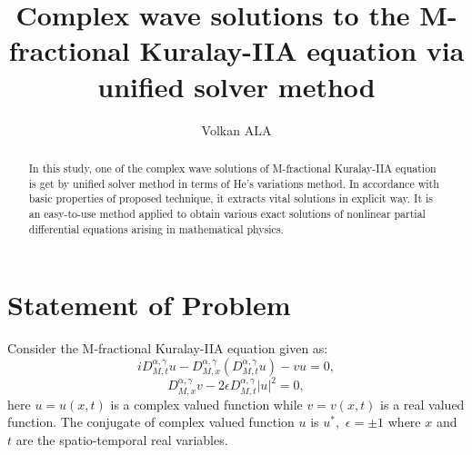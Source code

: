 \documentclass[12pt]{llncs}
\begin{document}
\fi

\title{Complex wave solutions to the M-fractional Kuralay-IIA equation via unified solver method}

\author{Volkan ALA 
  }

\maketitle

\begin{abstract}
In this study, one of the complex wave solutions of M-fractional Kuralay-IIA equation is get by unified solver method in terms of  He's variations method. In accordance with basic properties of proposed technique, it extracts vital solutions in explicit way. It is an easy-to-use method applied to obtain various exact solutions of nonlinear partial differential equations arising in mathematical physics. 

\end{abstract}
\section{Statement of Problem}
 

Consider the M-fractional Kuralay-IIA equation given as\cite{Zafar}:%
\begin{equation}
	iD_{M,t}^{\alpha ,\gamma }u- D_{M,x}^{\alpha ,\gamma }\left( D_{M,t}^{\alpha
		,\gamma }u\right) -vu=0,
\end{equation}%
\begin{equation}
	D_{M,x}^{\alpha ,\gamma }v-2\epsilon D_{M,t}^{\alpha ,\gamma }\left
	\vert
	u\right\vert ^{2}=0,
\end{equation}
here $u=u\left( x,t\right) $ is a complex valued function while $v=v\left(
x,t\right) $ is a real valued function. The conjugate of complex valued
function $u$ is $u^{\ast },$ $\epsilon =\pm 1$ where $x$ and $t$ are the
spatio-temporal real variables. 
\end{document}
